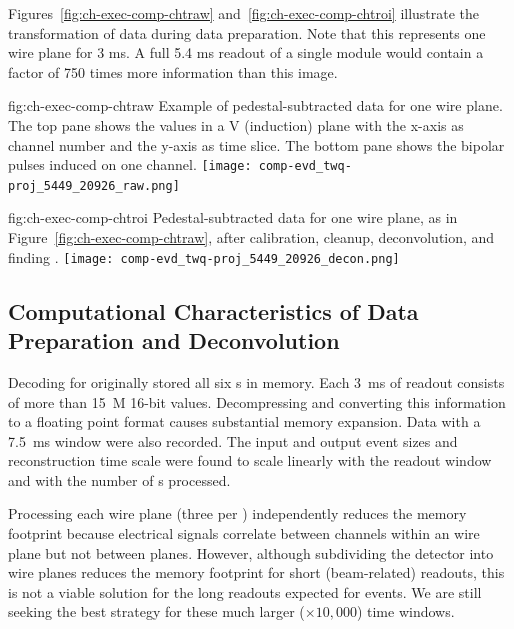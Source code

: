 Figures~\ref{fig:ch-exec-comp-chtraw} and~\ref{fig:ch-exec-comp-chtroi} illustrate the transformation of  data  during data preparation. Note that this represents one wire plane for 3 ms.  A full 5.4 ms readout of a single \nominalmodsize module would contain a factor of 750 times %
more information than this image.
\begin{dunefigure}
{fig:ch-exec-comp-chtraw}
{Example of pedestal-subtracted data for one   wire plane.  The top pane shows the  values in a V (induction) plane with the x-axis as channel number and the y-axis as time slice. The bottom pane shows the bipolar pulses induced on one channel.}
\texttt{[image: comp-evd\_twq-proj\_5449\_20926\_raw.png]}
\end{dunefigure}


\begin{dunefigure}
{fig:ch-exec-comp-chtroi}
{Pedestal-subtracted data for one  wire plane, as in Figure~\ref{fig:ch-exec-comp-chtraw}, after calibration, cleanup, deconvolution, and finding .}
 \texttt{[image: comp-evd\_twq-proj\_5449\_20926\_decon.png]}
\end{dunefigure}



\subsection{Computational Characteristics of Data Preparation and Deconvolution }

Decoding for  originally stored all six s in memory. Each \SI{3}{ms} of  readout consists of more than \SI{15}{M} 16-bit values. Decompressing and converting this information to a floating point format causes substantial memory expansion. 
  Data with a \SI{7.5}{ms} window were also recorded. 
The input and output event sizes and reconstruction time scale were found to scale linearly with the readout window and with the number of s processed. 

Processing each wire plane (three per ) independently reduces the memory footprint because electrical signals correlate between channels within an  wire plane but not between planes.
However,  although subdividing the detector into wire planes reduces the memory footprint for short (beam-related) readouts, this is  not a viable solution for the long readouts expected for  events. We are still seeking the best strategy for these much larger ($\times 10,000$) time windows. 

